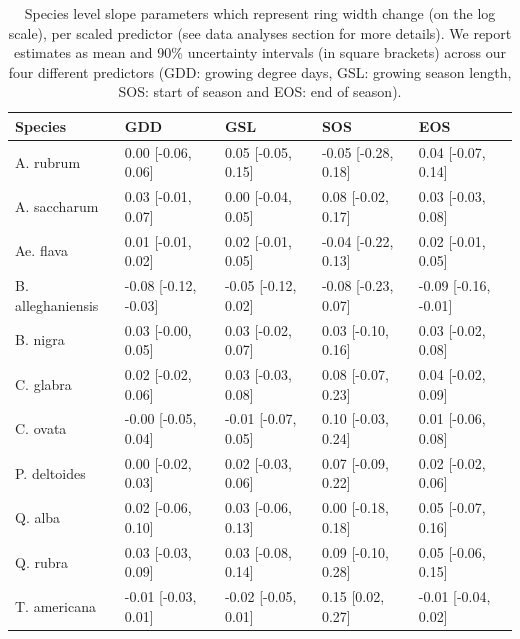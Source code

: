 \documentclass{article}\usepackage[]{graphicx}\usepackage[]{xcolor}
\begin{document}
\begin{table}[ht]
\centering
\caption{Species level slope parameters which represent ring width change (on the log scale), per scaled predictor (see data analyses section for more details). We report estimates as mean and 90\% uncertainty intervals (in square brackets) across our four different predictors (GDD: growing degree days, GSL: growing season length, SOS: start of season and EOS: end of season).} 
\label{tab:ts_slope_table}
\begin{tabular}{lllll}
  \hline
Species & GDD & GSL & SOS & EOS \\ 
  \hline
A. rubrum & 0.00 [-0.06, 0.06] & 0.05 [-0.05, 0.15] & -0.05 [-0.28, 0.18] & 0.04 [-0.07, 0.14] \\ 
  A. saccharum & 0.03 [-0.01, 0.07] & 0.00 [-0.04, 0.05] & 0.08 [-0.02, 0.17] & 0.03 [-0.03, 0.08] \\ 
  Ae. flava & 0.01 [-0.01, 0.02] & 0.02 [-0.01, 0.05] & -0.04 [-0.22, 0.13] & 0.02 [-0.01, 0.05] \\ 
  B. alleghaniensis & -0.08 [-0.12, -0.03] & -0.05 [-0.12, 0.02] & -0.08 [-0.23, 0.07] & -0.09 [-0.16, -0.01] \\ 
  B. nigra & 0.03 [-0.00, 0.05] & 0.03 [-0.02, 0.07] & 0.03 [-0.10, 0.16] & 0.03 [-0.02, 0.08] \\ 
  C. glabra & 0.02 [-0.02, 0.06] & 0.03 [-0.03, 0.08] & 0.08 [-0.07, 0.23] & 0.04 [-0.02, 0.09] \\ 
  C. ovata & -0.00 [-0.05, 0.04] & -0.01 [-0.07, 0.05] & 0.10 [-0.03, 0.24] & 0.01 [-0.06, 0.08] \\ 
  P. deltoides & 0.00 [-0.02, 0.03] & 0.02 [-0.03, 0.06] & 0.07 [-0.09, 0.22] & 0.02 [-0.02, 0.06] \\ 
  Q. alba & 0.02 [-0.06, 0.10] & 0.03 [-0.06, 0.13] & 0.00 [-0.18, 0.18] & 0.05 [-0.07, 0.16] \\ 
  Q. rubra & 0.03 [-0.03, 0.09] & 0.03 [-0.08, 0.14] & 0.09 [-0.10, 0.28] & 0.05 [-0.06, 0.15] \\ 
  T. americana & -0.01 [-0.03, 0.01] & -0.02 [-0.05, 0.01] & 0.15 [0.02, 0.27] & -0.01 [-0.04, 0.02] \\ 
   \hline
\end{tabular}
\end{table}
\end{document}
